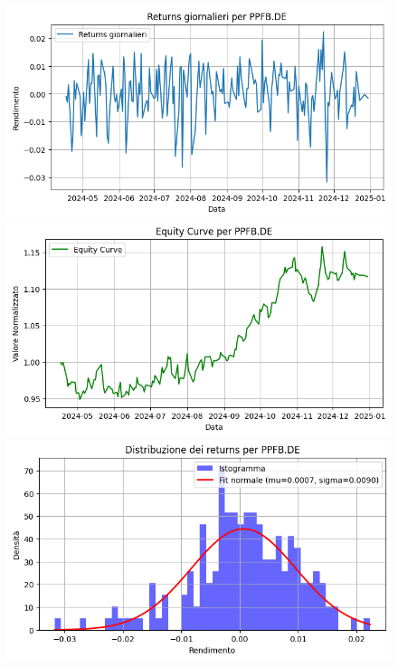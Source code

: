 \documentclass{article}%
\begin{document}
\begin{figure}[htbp]%
\begin{minipage}{0.31\textwidth}%
\includegraphics[width=\linewidth]{immagini_tickers/PPFB.DE_returns_plot.png}%
\end{minipage}%
\begin{minipage}{0.31\textwidth}%
\includegraphics[width=\linewidth]{immagini_tickers/PPFB.DE_equity_curve.png}%
\end{minipage}%
\begin{minipage}{0.31\textwidth}%
\includegraphics[width=\linewidth]{immagini_tickers/PPFB.DE_distribuzione_returns.png}%
\end{minipage}%
\end{figure}
\end{document}

